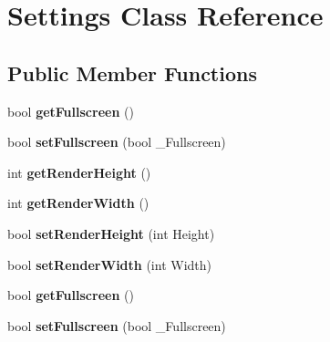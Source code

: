 \hypertarget{classSettings}{
\section{Settings Class Reference}
\label{df/d9a/classSettings}
}
\subsection*{Public Member Functions}
\begin{DoxyCompactItemize}
\item 
\hypertarget{classSettings_a9c2f80cb87b5b3e8f2da0b6056c2cad6}{
bool {\bfseries getFullscreen} ()}
\label{df/d9a/classSettings_a9c2f80cb87b5b3e8f2da0b6056c2cad6}

\item 
\hypertarget{classSettings_a7227367aa824b71d1366eddce9a94e3f}{
bool {\bfseries setFullscreen} (bool \_\-Fullscreen)}
\label{df/d9a/classSettings_a7227367aa824b71d1366eddce9a94e3f}

\item 
\hypertarget{classSettings_a0d620300e6eb872e6914cabad3035641}{
int {\bfseries getRenderHeight} ()}
\label{df/d9a/classSettings_a0d620300e6eb872e6914cabad3035641}

\item 
\hypertarget{classSettings_aea6ac481630cf986acf3853939c6bdf3}{
int {\bfseries getRenderWidth} ()}
\label{df/d9a/classSettings_aea6ac481630cf986acf3853939c6bdf3}

\item 
\hypertarget{classSettings_a0381303bcccf944c77b8f88dcb4ffa96}{
bool {\bfseries setRenderHeight} (int Height)}
\label{df/d9a/classSettings_a0381303bcccf944c77b8f88dcb4ffa96}

\item 
\hypertarget{classSettings_abb497fd25c4184054c1bb89a7e58b5d3}{
bool {\bfseries setRenderWidth} (int Width)}
\label{df/d9a/classSettings_abb497fd25c4184054c1bb89a7e58b5d3}

\item 
\hypertarget{classSettings_a9c2f80cb87b5b3e8f2da0b6056c2cad6}{
bool {\bfseries getFullscreen} ()}
\label{df/d9a/classSettings_a9c2f80cb87b5b3e8f2da0b6056c2cad6}

\item 
\hypertarget{classSettings_a7227367aa824b71d1366eddce9a94e3f}{
bool {\bfseries setFullscreen} (bool \_\-Fullscreen)}
\label{df/d9a/classSettings_a7227367aa824b71d1366eddce9a94e3f}


\end{DoxyCompactItemize}
